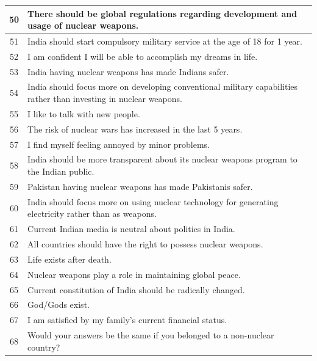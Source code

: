 \documentclass[12pt,a4paper]{article}
\begin{document}
\begin{longtable}{|c|p{12cm}|}
50 & There should be global regulations regarding development and usage of nuclear weapons. \\ \hline
51 & India should start compulsory military service at the age of 18 for 1 year. \\ \hline
52 & I am confident I will be able to accomplish my dreams in life. \\ \hline
53 & India having nuclear weapons has made Indians safer. \\ \hline
54 & India should focus more on developing conventional military capabilities rather than investing in nuclear weapons. \\ \hline
55 & I like to talk with new people. \\ \hline
56 & The risk of nuclear wars has increased in the last 5 years. \\ \hline
57 & I find myself feeling annoyed by minor problems. \\ \hline
58 & India should be more transparent about its nuclear weapons program to the Indian public. \\ \hline
59 & Pakistan having nuclear weapons has made Pakistanis safer. \\ \hline
60 & India should focus more on using nuclear technology for generating electricity rather than as weapons. \\ \hline
61 & Current Indian media is neutral about politics in India. \\ \hline
62 & All countries should have the right to possess nuclear weapons. \\ \hline
63 & Life exists after death. \\ \hline
64 & Nuclear weapons play a role in maintaining global peace. \\ \hline
65 & Current constitution of India should be radically changed. \\ \hline
66 & God/Gods exist. \\ \hline
67 & I am satisfied by my family’s current financial status. \\ \hline
68 & Would your answers be the same if you belonged to a non-nuclear country? \\ \hline

\end{longtable}
\end{document}
